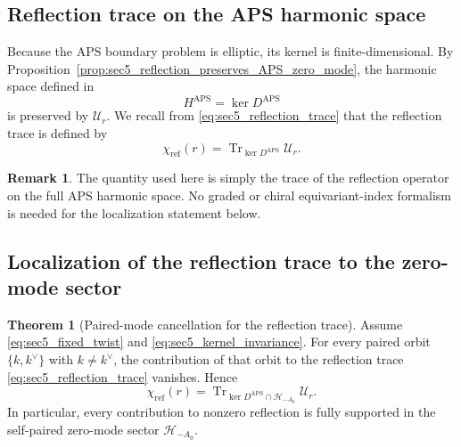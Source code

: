 \documentclass[11pt]{article}
\theoremstyle{definition}
\newtheorem{theorem}{Theorem}[section]
\newtheorem{remark}[remark]{Remark}
\DeclareMathOperator{\APS}{APS}
\numberwithin{equation}{section}
\DeclareMathOperator{\Tr}{Tr}
\begin{document}
\subsection{Reflection trace on the APS harmonic space}

Because the APS boundary problem is elliptic, its kernel is finite-dimensional. By Proposition~\ref{prop:sec5_reflection_preserves_APS_zero_mode}, the harmonic space defined in
\begin{equation}\label{eq:sec5_harmonic_kernel}
H^{\APS} = \ker D^{\APS}
\end{equation}
is preserved by \(\mathcal U_r\). We recall from \eqref{eq:sec5_reflection_trace} that the reflection trace is defined by 
\begin{equation}\label{eq:sec5_reflection_trace_}
\chi_{\text{ref}}(r)
= \Tr_{\ker D^{\APS}} \mathcal U_r.
\end{equation}

\begin{remark}
\label{rem:sec5_no_equivariant_index}
The quantity used here is simply the trace of the reflection operator on the full APS harmonic space. No graded or chiral equivariant-index formalism is needed for the localization statement below.
\end{remark}

\subsection{Localization of the reflection trace to the zero-mode sector}

\begin{theorem}[Paired-mode cancellation for the reflection trace]
\label{thm:sec5_reflection_trace_localization}
Assume \eqref{eq:sec5_fixed_twist} and \eqref{eq:sec5_kernel_invariance}. For every paired orbit \(\{k,k^\vee\}\) with \(k\neq k^\vee\), the contribution of that orbit to the reflection trace \eqref{eq:sec5_reflection_trace} vanishes. Hence
\begin{equation}\label{eq:sec5_zero_mode_localization}
\chi_{\text{ref}}(r)
= \Tr_{\ker D^{\APS}\cap \mathcal H_{-A_0}} \mathcal U_r.
\end{equation}
In particular, every contribution to nonzero reflection is fully supported in the self-paired zero-mode sector \(\mathcal H_{-A_0}\).
\end{theorem}
\end{document}
